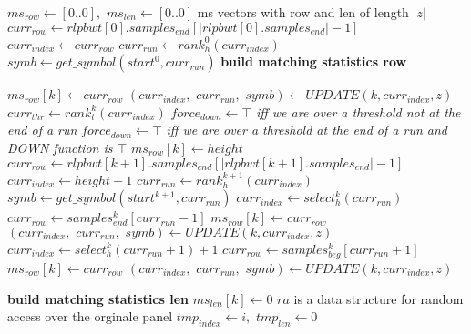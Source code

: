 \documentclass[a4paper,12pt, oneside]{book}
\begin{document}
\begin{algorithm}
  \scriptsize
  \begin{algorithmic}[1]
    \State $ms_{row}\gets [0..0],\,\,ms_{len}\gets [0..0]$
    \Comment ms vectors with row and len of length $|z|$
    \State $curr_{row}\gets
    rlpbwt[0].samples_{end}[|rlpbwt[0].samples_{end}|-1]$
    \State $curr_{index}\gets curr_{row}$
    \State $curr_{run}\gets rank_h^0(curr_{index})$
    \State $symb\gets get\_symbol(start^0, curr_{run})$
    \Comment \textbf{build matching statistics row}
    \For {\textit{every} $k\in[0, |z|)$}

    \State $ms_{row}[k]\gets curr_{row}$
     \State $(curr_{index},\,\,curr_{run},\,\,symb)\gets UPDATE(k, curr_{index},
    z)$ 
    \EndIf
    \Else
    \State $curr_{thr}\gets rank_t^k(curr_{index})$
    \State $force_{down} \gets \top$\textit{ iff we are over a threshold not at
    the end of a run}
     \State $force_{down} \gets \top$\textit{ iff we are over a threshold at
    the end of a run and DOWN function is $\top$}
    \State $ms_{row}[k]\gets height$
    \State $curr_{row}\gets
    rlpbwt[k+1].samples_{end}[|rlpbwt[k+1].samples_{end}|-1]$
    \State $curr_{index}\gets height-1$
    \State $curr_{run}\gets rank_h^{k+1}(curr_{index})$
    \State $symb\gets get\_symbol(start^{k+1}, curr_{run})$
    \EndIf
    \State $curr_{index}\gets select_h^{k}(curr_{run})$
    \State $curr_{row}\gets samples_{end}^k[curr_{run}-1]$
    \State $ms_{row}[k]\gets curr_{row}$
     \State $(curr_{index},\,\,curr_{run},\,\,symb)\gets UPDATE(k, curr_{index},
    z)$ 
    \EndIf
    \Else
    \State $curr_{index}\gets select_h^{k}(curr_{run}+1)+1$
    \State $curr_{row}\gets samples_{beg}^k[curr_{run}+1]$
    \State $ms_{row}[k]\gets curr_{row}$
     \State $(curr_{index},\,\,curr_{run},\,\,symb)\gets UPDATE(k, curr_{index},
    z)$ 
    \EndIf
    \EndIf
    
    \EndIf
    \EndFor
    \Comment \textbf{build matching statistics len}
    \For {\textit{every} $k\in[0,|ms_{row}|)$}
    \State $ms_{len}[k]\gets 0$
    \Else
    \Comment $ra$ is a data structure for random access over the orginale panel
    \State $tmp_{index}\gets i,\,\,tmp_{len}\gets 0$
   

\end{algorithmic}
\end{algorithm}
\end{document}
